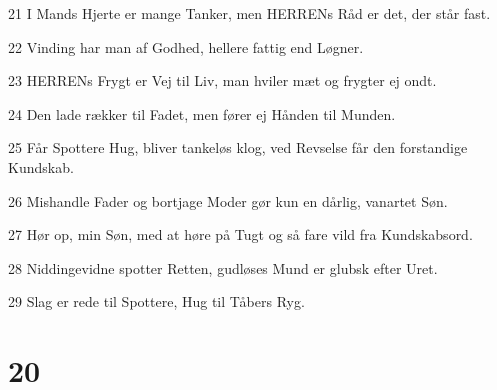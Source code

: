 \par 21 I Mands Hjerte er mange Tanker, men HERRENs Råd er det, der står fast.
\par 22 Vinding har man af Godhed, hellere fattig end Løgner.
\par 23 HERRENs Frygt er Vej til Liv, man hviler mæt og frygter ej ondt.
\par 24 Den lade rækker til Fadet, men fører ej Hånden til Munden.
\par 25 Får Spottere Hug, bliver tankeløs klog, ved Revselse får den forstandige Kundskab.
\par 26 Mishandle Fader og bortjage Moder gør kun en dårlig, vanartet Søn.
\par 27 Hør op, min Søn, med at høre på Tugt og så fare vild fra Kundskabsord.
\par 28 Niddingevidne spotter Retten, gudløses Mund er glubsk efter Uret.
\par 29 Slag er rede til Spottere, Hug til Tåbers Ryg.

\chapter{20}

